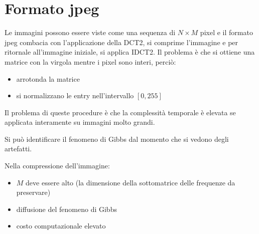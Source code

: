 \chapter{Formato jpeg}
Le immagini possono essere viste come una sequenza di $N\times M$ pixel e 
il formato jpeg combacia con l'applicazione della DCT2, si comprime l'immagine 
e per ritornale all'immagine iniziale, si applica IDCT2. Il problema è che si ottiene 
una matrice con la virgola mentre i pixel sono interi, perciò:
\begin{itemize}
    \item arrotonda la matrice
    \item si normalizzano le entry nell'intervallo $[0,255]$ 
\end{itemize}

\begin{nota}
    Il problema di queste procedure è che la complessità temporale è elevata se 
    applicata interamente su immagini molto grandi.
\end{nota}

\begin{nota}
    Si può identificare il fenomeno di Gibbs dal momento che si vedono degli artefatti.
\end{nota}

Nella compressione dell'immagine:
\begin{itemize}
    \item $M$ deve essere alto (la dimensione della sottomatrice delle frequenze 
    da preservare)
    \item diffusione del fenomeno di Gibbs
    \item costo computazionale elevato
\end{itemize}